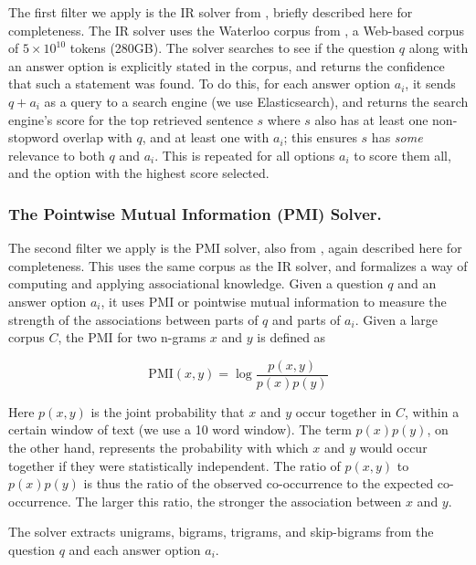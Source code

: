 The first filter we apply is the IR solver from \citet{clark2016combining}, briefly described here for completeness. The IR solver uses the Waterloo corpus from \cite{clark2016combining}, a Web-based corpus of $5 \times 10^{10}$ tokens (280GB). The solver searches to see if the question $q$ along with an answer option is explicitly stated in the corpus, and returns the confidence that such a statement was found. To do this, for each answer option $a_i$, it sends $q + a_i$ as a query to a search engine (we use Elasticsearch), and returns the search engine's score for the top retrieved sentence $s$ where $s$ also has at least one non-stopword overlap with $q$, and at least one with $a_i$; this ensures $s$ has {\it some} relevance to both $q$ and $a_i$. This is repeated for all options $a_i$ to score them all, and the option with the highest score selected.

\subsubsection{The Pointwise Mutual Information (PMI) Solver. }

The second filter we apply is the PMI solver, also from \citet{clark2016combining}, again described here for completeness. This uses the same corpus as the IR solver, and formalizes a way of computing and applying associational knowledge. Given a question $q$ and an answer option $a_i$, it uses PMI or pointwise mutual information \cite{church1989} to measure the strength of the associations between parts of $q$ and parts of $a_i$. Given a large corpus $C$, the PMI for two n-grams $x$ and $y$ is defined as

\begin{equation*}
\mathrm{PMI}(x,y) = \log \frac{p(x,y)}{p(x) p(y)}
\end{equation*}

Here $p(x,y)$ is the joint probability that $x$ and $y$ occur together in $C$, within a certain window of text (we use a 10 word window). The term $p(x) p(y)$, on the other hand, represents the probability with which $x$ and $y$ would occur together if they were statistically independent. The ratio of $p(x,y)$ to $p(x) p(y)$ is thus the ratio of the observed co-occurrence to the expected co-occurrence. The larger this ratio, the stronger the association between $x$ and $y$.

The solver extracts unigrams, bigrams, trigrams, and skip-bigrams from the question $q$ and each answer option $a_i$.

